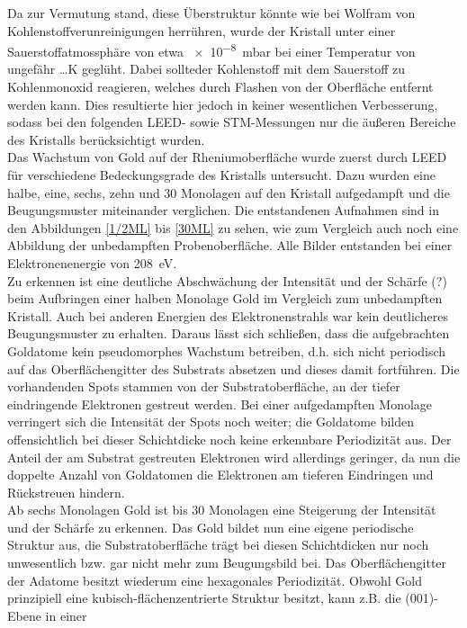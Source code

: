 Da zur Vermutung stand, diese Überstruktur könnte wie bei Wolfram von Kohlenstoffverunreinigungen
herrühren, wurde der Kristall unter einer Sauerstoffatmossphäre von etwa \SI{e-8}{mbar} bei einer
Temperatur von ungefähr \ldots K geglüht. Dabei sollteder Kohlenstoff mit dem Sauerstoff zu
Kohlenmonoxid reagieren, welches durch Flashen von der Oberfläche entfernt werden kann. Dies
resultierte hier jedoch in keiner wesentlichen Verbesserung, sodass bei den folgenden LEED- sowie
STM-Messungen nur die äußeren Bereiche des Kristalls berücksichtigt wurden.\\
Das Wachstum von Gold auf der Rheniumoberfläche wurde zuerst durch LEED für
verschiedene Bedeckungsgrade des Kristalls untersucht. Dazu wurden eine halbe, eine, sechs, zehn und
30 Monolagen auf den Kristall aufgedampft und die Beugungsmuster miteinander verglichen. Die
entstandenen Aufnahmen sind in den Abbildungen \ref{1/2ML} bis \ref{30ML} zu sehen, wie zum
Vergleich auch noch eine Abbildung der unbedampften Probenoberfläche. Alle Bilder entstanden
bei einer Elektronenenergie von \SI{208}{eV}.\\
Zu erkennen ist eine deutliche Abschwächung der Intensität und der Schärfe (?) beim Aufbringen einer
halben Monolage Gold im Vergleich zum unbedampften Kristall. Auch bei anderen Energien des
Elektronenstrahls war kein deutlicheres Beugungsmuster zu erhalten. Daraus lässt sich schließen,
dass die aufgebrachten Goldatome kein pseudomorphes Wachstum betreiben, d.h. sich nicht periodisch
auf das Oberflächengitter des Substrats absetzen und dieses damit fortführen. Die vorhandenden Spots
stammen von der Substratoberfläche, an der tiefer eindringende Elektronen gestreut werden. Bei einer
aufgedampften Monolage verringert sich die Intensität der Spots noch weiter; die Goldatome bilden
offensichtlich bei dieser Schichtdicke noch keine erkennbare Periodizität aus. Der Anteil der am
Substrat gestreuten Elektronen wird allerdings geringer, da nun die doppelte Anzahl von Goldatomen
die Elektronen am tieferen Eindringen und Rückstreuen hindern.\\
Ab sechs Monolagen Gold ist bis 30 Monolagen eine Steigerung der Intensität und der Schärfe zu
erkennen. Das Gold bildet nun eine eigene periodische Struktur aus, die Substratoberfläche trägt
bei diesen Schichtdicken nur noch unwesentlich bzw. gar nicht mehr zum Beugungsbild bei. Das
Oberflächengitter der Adatome besitzt wiederum eine hexagonales Periodizität. Obwohl Gold
prinzipiell eine kubisch-flächenzentrierte Struktur besitzt, kann z.B. die (001)-Ebene in einer
